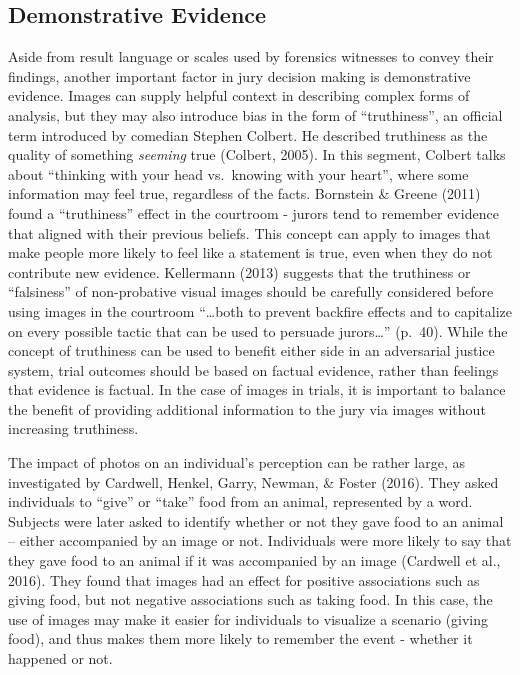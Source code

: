 \documentclass[print]{nuthesis}
\begin{document}
\hypertarget{demonstrative-evidence}{%
\subsection{Demonstrative Evidence}\label{demonstrative-evidence}}

Aside from result language or scales used by forensics witnesses to convey their findings, another important factor in jury decision making is demonstrative evidence.
Images can supply helpful context in describing complex forms of analysis, but they may also introduce bias in the form of ``truthiness'', an official term introduced by comedian Stephen Colbert.
He described truthiness as the quality of something \emph{seeming} true (Colbert, 2005).
In this segment, Colbert talks about ``thinking with your head vs.~knowing with your heart'', where some information may feel true, regardless of the facts.
Bornstein \& Greene (2011) found a ``truthiness'' effect in the courtroom - jurors tend to remember evidence that aligned with their previous beliefs.
This concept can apply to images that make people more likely to feel like a statement is true, even when they do not contribute new evidence.
Kellermann (2013) suggests that the truthiness or ``falsiness'' of non-probative visual images should be carefully considered before using images in the courtroom ``\ldots both to prevent backfire effects and to capitalize on every possible tactic that can be used to persuade jurors\ldots{}'' (p.~40).
While the concept of truthiness can be used to benefit either side in an adversarial justice system, trial outcomes should be based on factual evidence, rather than feelings that evidence is factual.
In the case of images in trials, it is important to balance the benefit of providing additional information to the jury via images without increasing truthiness.

The impact of photos on an individual's perception can be rather large, as investigated by Cardwell, Henkel, Garry, Newman, \& Foster (2016).
They asked individuals to ``give'' or ``take'' food from an animal, represented by a word.
Subjects were later asked to identify whether or not they gave food to an animal -- either accompanied by an image or not.
Individuals were more likely to say that they gave food to an animal if it was accompanied by an image (Cardwell et al., 2016).
They found that images had an effect for positive associations such as giving food, but not negative associations such as taking food.
In this case, the use of images may make it easier for individuals to visualize a scenario (giving food), and thus makes them more likely to remember the event - whether it happened or not.
\end{document}
